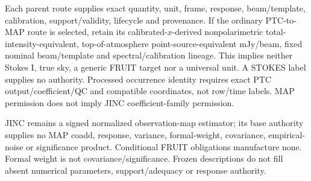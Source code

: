 {{Each parent route supplies exact quantity, unit, frame, response, beam/template,
calibration, support/validity, lifecycle and provenance. If the ordinary
PTC-to-MAP route is selected, retain its calibrated-$x$-derived nonpolarimetric
total-intensity-equivalent, top-of-atmosphere point-source-equivalent mJy/beam,
fixed nominal beam/template and spectral/calibration lineage. This implies
neither Stokes I, true sky, a generic FRUIT target nor a universal unit.
A STOKES label supplies no authority. Processed occurrence identity requires
exact PTC output/coefficient/QC and compatible coordinates, not row/time labels.
MAP permission does not imply JINC coefficient-family permission.

JINC remains a signed normalized observation-map estimator; its base authority
supplies no MAP coadd, response, variance, formal-weight, covariance, empirical-
noise or significance product. Conditional FRUIT obligations manufacture none.
Formal weight is not covariance/significance. Frozen descriptions do not fill
absent numerical parameters, support/adequacy or response authority.
}}
